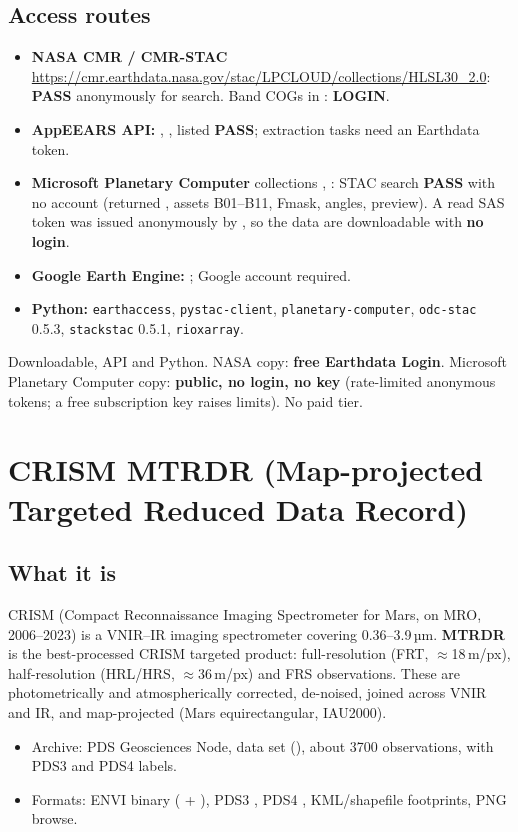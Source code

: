\documentclass[10pt,a4paper]{article}
\newcommand{\OK}{\textcolor{ok}{\textbf{PASS}}}
\newcommand{\AUTH}{\textcolor{mid}{\textbf{LOGIN}}}
\begin{document}
\subsection{Access routes}
\begin{itemize}
\item \textbf{NASA CMR / CMR-STAC} \url{https://cmr.earthdata.nasa.gov/stac/LPCLOUD/collections/HLSL30_2.0}: \OK{} anonymously for search. Band COGs in : \AUTH{}.
\item \textbf{AppEEARS API:} , ,  listed \OK{}; extraction tasks need an Earthdata token.
\item \textbf{Microsoft Planetary Computer} collections , : STAC search \OK{} with no account (returned , assets B01--B11, Fmask, angles, preview). A read SAS token was issued anonymously by , so the data are downloadable with \textbf{no login}.
\item \textbf{Google Earth Engine:} ; Google account required.
\item \textbf{Python:} \texttt{earthaccess}, \texttt{pystac-client}, \texttt{planetary-computer}, \texttt{odc-stac} 0.5.3, \texttt{stackstac} 0.5.1, \texttt{rioxarray}.
\end{itemize}
\begin{verdict}
Downloadable, API and Python. NASA copy: \textbf{free Earthdata Login}. Microsoft Planetary Computer copy: \textbf{public, no login, no key} (rate-limited anonymous tokens; a free subscription key raises limits). No paid tier.
\end{verdict}

\section{CRISM MTRDR (Map-projected Targeted Reduced Data Record)}
\subsection{What it is}
CRISM (Compact Reconnaissance Imaging Spectrometer for Mars, on MRO, 2006--2023) is a VNIR--IR imaging spectrometer covering 0.36--3.9\,µm. \textbf{MTRDR} is the best-processed CRISM targeted product: full-resolution (FRT, $\approx$18\,m/px), half-resolution (HRL/HRS, $\approx$36\,m/px) and FRS observations. These are photometrically and atmospherically corrected, de-noised, joined across VNIR and IR, and map-projected (Mars equirectangular, IAU2000).
\begin{itemize}
\item Archive: PDS Geosciences Node, data set  (), about 3700 observations, with PDS3 and PDS4 labels.
\item Formats: ENVI binary ( + ), PDS3 , PDS4 , KML/shapefile footprints, PNG browse.
\end{itemize}
\end{document}
